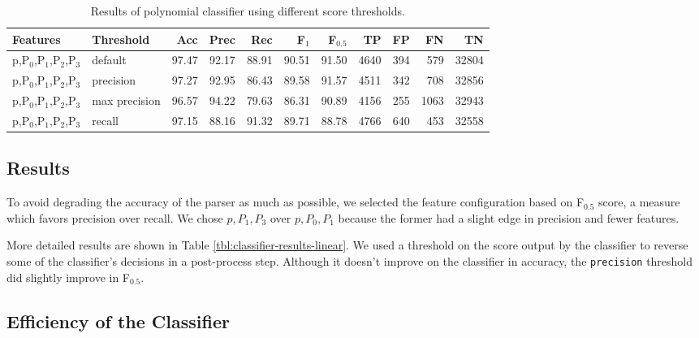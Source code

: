 \documentclass[11pt]{article}
\begin{document}
\begin{table}[htbp]

\begin{tabular}{llrrrrrrrrr}
{\bf Features} & {\bf Threshold} & {\bf Acc} & {\bf Prec} & {\bf Rec} & {\bf F$_{\text{1}}$} & {\bf F$_{\text{0.5}}$} & {\bf TP} & {\bf FP} & {\bf FN} & {\bf TN} \\
\hline
p,P$_{\text{0}}$,P$_{\text{1}}$,P$_{\text{2}}$,P$_{\text{3}}$ & default & 97.47 & 92.17 & 88.91 & 90.51 & 91.50 & 4640 & 394 & 579 & 32804\\
p,P$_{\text{0}}$,P$_{\text{1}}$,P$_{\text{2}}$,P$_{\text{3}}$ & precision & 97.27 & 92.95 & 86.43 & 89.58 & 91.57 & 4511 & 342 & 708 & 32856\\
p,P$_{\text{0}}$,P$_{\text{1}}$,P$_{\text{2}}$,P$_{\text{3}}$ & max precision & 96.57 & 94.22 & 79.63 & 86.31 & 90.89 & 4156 & 255 & 1063 & 32943\\
p,P$_{\text{0}}$,P$_{\text{1}}$,P$_{\text{2}}$,P$_{\text{3}}$ & recall & 97.15 & 88.16 & 91.32 & 89.71 & 88.78 & 4766 & 640 & 453 & 32558\\
\end{tabular}

\caption{Results of polynomial classifier using different score thresholds.}
\label{tbl:classifier-results-poly}
\end{table}

\subsection{Results}
\label{sec-4-4}
\label{sec:linear-classifier}

To avoid degrading the accuracy of the parser as much as possible, we selected
the feature configuration based on F$_{\text{0.5}}$ score, a measure which
favors precision over recall. We chose $p,P_{1},P_{3}$ over $p,P_{0},P_{1}$
because the former had a slight edge in precision and fewer features.

More
detailed results are shown in Table \ref{tbl:classifier-results-linear}. We used
a threshold on the score output by the classifier to reverse some of the
classifier's decisions in a post-process step. Although it doesn't improve on
the classifier in accuracy, the \texttt{precision} threshold did slightly
improve in F$_{\text{0.5}}$.

\subsection{Efficiency of the Classifier}
\label{sec-4-5}
\end{document}
